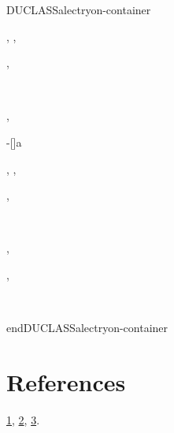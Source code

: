 \documentclass[a4paper]{article}
\newenvironment{DUclass}[1]%
  {%
   \def\DocutilsClassFunctionName{DUCLASS#1}
     \csname \DocutilsClassFunctionName \endcsname}%
  {\csname end\DocutilsClassFunctionName \endcsname}%
\begin{document}
\begin{DUclass}{alectryon-container}
\begin{alectryon}
\begin{sentence}
\begin{output}
\begin{goals}
\begin{goal}
\begin{hyps}
          \end{hyps}
          \sep
          \infrule{}
          \sep
          \begin{conclusion}
          \end{conclusion}
        \end{goal}
      \end{goals}
    \end{output}
  \end{sentence}
  \sep
  \begin{sentence}
    \begin{input}
      ~
    \end{input}
    \sep
    \begin{output}
      \begin{goals}
        \begin{goal}
          \begin{hyps}
            \hyp[]{a}{}
          \end{hyps}
          \sep
          \infrule{}
          \sep
          \begin{conclusion}
          \end{conclusion}
        \end{goal}
      \end{goals}
    \end{output}
  \end{sentence}
  \sep
  \begin{sentence}
    \begin{input}
      ~
    \end{input}
  \end{sentence}
  \sep
  \begin{sentence}
    \begin{input}
      \nl
    \end{input}
  \end{sentence}
  \sep
  \begin{sentence}
    \begin{input}
      ~
    \end{input}
  \end{sentence}
\end{alectryon}
\end{DUclass}


\section{References%
  \label{references}%
}

\hyperref[corner-cases-rst-s-pose-h-a-body-0]{1}, \hyperref[corner-cases-rst-s-pose-h-a-type-0]{2}, \hyperref[corner-cases-rst-s-pose-h-a-0]{3}.
\end{document}
